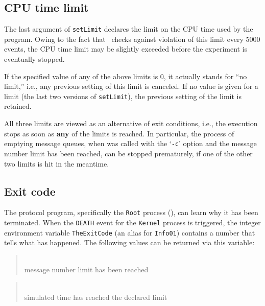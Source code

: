 \subsection{CPU time limit}
\label{rm_ts_cp}

The last argument of {\tt setLimit} declares the limit on the CPU time used
by the program.
Owing to the fact that \smurph\ checks against violation of this limit
every 5000 events, the CPU time limit
may be slightly exceeded before the experiment is eventually stopped.

\medskip

If the specified value of any of the above limits is 0, it actually stands
for ``no limit,'' i.e., any previous setting of this limit is canceled.
If no value is given for a limit (the last two versions of {\tt setLimit}),
the previous setting of the limit is retained.

All three limits are viewed as an alternative of exit conditions, i.e.,
the execution stops as soon as {\bf any} of the limits is
reached.
In particular, the process of emptying message queues, when {\smurph}
was called with the `{\tt -c}' option and the message number limit has been
reached, can be stopped prematurely, if one of the other two limits
is hit in the meantime.

\subsection{Exit code}
\label{rm_ts_ec}

The protocol program, specifically the {\tt Root} process (),
can learn why it has been terminated.
When the {\tt DEATH} event for the {\tt Kernel} process is triggered,
the integer environment variable {\tt TheExitCode} (an alias for {\tt Info01})
contains a number that tells what has happened.
The following values can be returned via this variable:

\medskip

\begin{quote}
\noindent{}\\ \hspace{0in}
message number limit has been reached
\end{quote}

\begin{quote}
\noindent{}\\ \hspace{0in}
simulated time has reached the declared limit
\end{quote}

